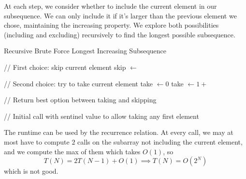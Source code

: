 \documentclass{article}
\begin{document}
    \begin{algo}
      At each step, we consider whether to include the current element in our subsequence. We can only include it if it's larger than the previous element we chose, maintaining the increasing property. We explore both possibilities (including and excluding) recursively to find the longest possible subsequence.
      \begin{algorithm}[H]
        \caption{Recursive Brute Force Longest Increasing Subsequence}
        \label{alg:reclis}
        \begin{algorithmic}
            
              
              \State {}  
            \EndIf

            \State // First choice: skip current element
            \State skip $\gets$   

            \State // Second choice: try to take current element
            \State take $\gets 0$  
              
              \State take $\gets 1 +$   
            \EndIf {}

            \State // Return best option between taking and skipping
            \State {}  
          \EndFunction
          
          \State // Initial call with sentinel value to allow taking any first element
          \State {}  
        \end{algorithmic}
      \end{algorithm}
      The runtime can be used by the recurrence relation. At every call, we may at most have to compute $2$ calls on the subarray not including the current element, and we compute the max of them which takes $O(1)$, so 
      \begin{equation}
        T(N) = 2 T(N-1) + O(1) \implies T(N) = O(2^N)
      \end{equation}
      which is not good. 
    \end{algo}
\end{document}
